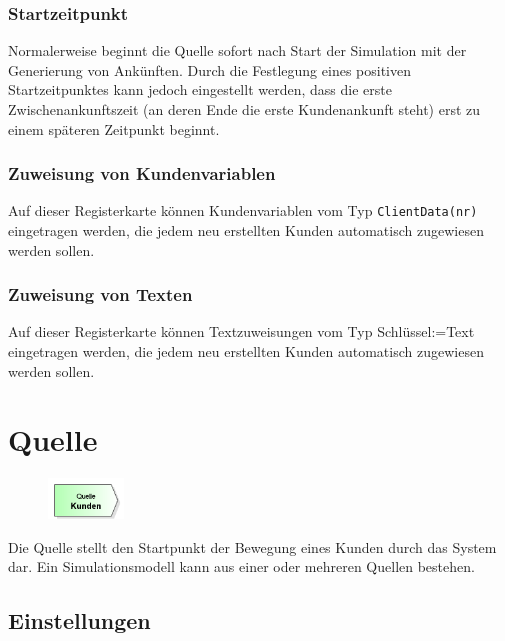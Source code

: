 \subsubsection*{Startzeitpunkt}

Normalerweise beginnt die Quelle sofort nach Start der Simulation mit der Generierung von
Ankünften. Durch die Festlegung eines positiven Startzeitpunktes kann jedoch eingestellt
werden, dass die erste Zwischenankunftszeit (an deren Ende die erste Kundenankunft steht) erst
zu einem späteren Zeitpunkt beginnt.

\subsubsection*{Zuweisung von Kundenvariablen}

Auf dieser Registerkarte können Kundenvariablen vom Typ \texttt{ClientData(nr)} eingetragen werden,
die jedem neu erstellten Kunden automatisch zugewiesen werden sollen.

\subsubsection*{Zuweisung von Texten}

Auf dieser Registerkarte können Textzuweisungen vom Typ Schlüssel:=Text eingetragen werden,
die jedem neu erstellten Kunden automatisch zugewiesen werden sollen.


\section{Quelle}
\label{ref:ModelElementSource}

\begin{figure}
\vspace{-22pt}
\includegraphics[width=2cm]{imageModelElementSource.png}
\vspace{-22pt}
\end{figure}

Die Quelle stellt den Startpunkt der Bewegung eines Kunden durch das System dar.
Ein Simulationsmodell kann aus einer oder mehreren Quellen bestehen.

\subsection*{Einstellungen}

